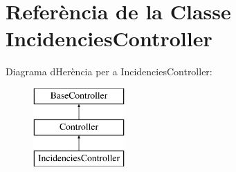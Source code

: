 \hypertarget{class_app_1_1_http_1_1_controllers_1_1_incidencies_controller}{}\section{Referència de la Classe Incidencies\+Controller}
\label{class_app_1_1_http_1_1_controllers_1_1_incidencies_controller}
Diagrama d\textquotesingle{}Herència per a Incidencies\+Controller\+:\begin{figure}[H]
\begin{center}
\leavevmode
\includegraphics[height=3.000000cm]{class_app_1_1_http_1_1_controllers_1_1_incidencies_controller}
\end{center}
\end{figure}
